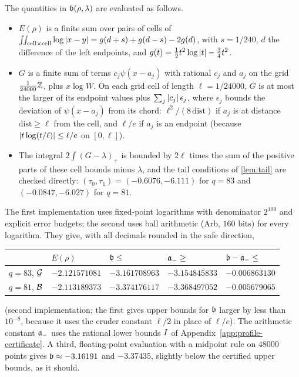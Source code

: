 The quantities in $\mathfrak{b}(\rho,\lambda)$ are evaluated as follows.
\begin{itemize}
\item $E(\rho)$ is a finite sum over pairs of cells of
$\iint_{\text{cell}\times\text{cell}}\log\left\lvert x-y\right\rvert=g(d+s)+g(d-s)-2g(d)$, with $s=1/240$, $d$ the
difference of the left endpoints, and $g(t)=\frac12t^2\log\left\lvert t\right\rvert-\frac34t^2$.
\item $G$ is a finite sum of terms $c_j\psi(x-a_j)$ with rational $c_j$ and $a_j$ on the grid
$\frac1{24000}\mathbb{Z}$, plus $x\log W$. On each grid cell of length $\ell=1/24000$, $G$ is at most the
larger of its endpoint values plus $\sum_j\left\lvert c_j\right\rvert\epsilon_j$, where $\epsilon_j$ bounds the
deviation of $\psi(x-a_j)$ from its chord: $\ell^2/(8\,\mathrm{dist})$ if $a_j$ is at distance
$\mathrm{dist}\ge\ell$ from the cell, and $\ell/e$ if $a_j$ is an endpoint (because
$\left\lvert t\log(t/\ell)\right\rvert\le\ell/e$ on $[0,\ell]$).
\item The integral $2\int(G-\lambda)_+$ is bounded by $2\ell$ times the sum of the positive parts
of these cell bounds minus $\lambda$, and the tail conditions of \cref{lem:tail} are checked
directly: $(\tau_0,\tau_1)=(-0.6076,-6.111)$ for $q=83$ and $(-0.0847,-6.027)$ for $q=81$.
\end{itemize}
The first implementation uses fixed-point logarithms with denominator $2^{100}$ and explicit error
budgets; the second uses ball arithmetic (Arb, $160$ bits) for every logarithm. They give, with all decimals rounded in the safe direction,
\begin{center}
\begin{tabular}{@{}lllll@{}}
\toprule
 & $E(\rho)$ & $\mathfrak{b}\le$ & $\mathfrak{a}_-\ge$ & $\mathfrak{b}-\mathfrak{a}_-\le$\\
\midrule
$q=83$, $\mathcal{G}$ & $-2.121571081$ & $-3.161708963$ & $-3.154845833$ & $-0.006863130$\\
$q=81$, $\mathcal{B}$ & $-2.113189373$ & $-3.374176117$ & $-3.368497052$ & $-0.005679065$\\
\bottomrule
\end{tabular}
\end{center}
(second implementation; the first gives upper bounds for $\mathfrak{b}$ larger by less than
$10^{-8}$, because it uses the cruder constant $\ell/2$ in place of $\ell/e$). The arithmetic
constant $\mathfrak{a}_-$ uses the rational lower bounds $I$ of Appendix~\ref{app:profile-certificate}. A
third, floating-point evaluation with a midpoint rule on $48000$ points gives
$\mathfrak{b}\approx-3.16191$ and $-3.37435$, slightly below the certified upper bounds, as it should.

